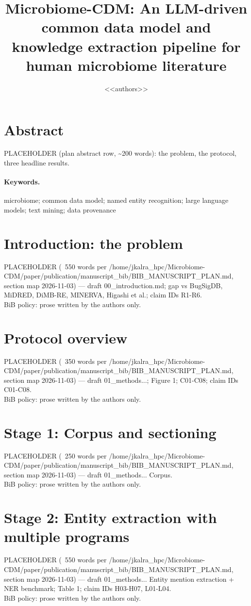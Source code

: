 \documentclass[11pt,a4paper]{article}
\title{Microbiome-CDM: An LLM-driven common data model and knowledge
extraction pipeline for human microbiome literature}
\author{<<authors>>}
\date{}
\begin{document}
\maketitle

\section*{Abstract}
PLACEHOLDER (plan abstract row, \textasciitilde200 words): the problem, the protocol, three headline results.

\paragraph{Keywords.} microbiome; common data model; named entity recognition; large language models; text mining; data provenance %

\section{Introduction: the problem}
PLACEHOLDER (~550 words per /home/jkalra\_hpc/Microbiome-CDM/paper/publication/manuscript\_bib/BIB\_MANUSCRIPT\_PLAN.md, section map 2026-11-03) --- draft 00\_introduction.md; gap vs BugSigDB, MiDRED, DiMB-RE, MINERVA, Higashi et al.; claim IDs R1-R6.\\
BiB policy: prose written by the authors only.

\section{Protocol overview}
PLACEHOLDER (~350 words per /home/jkalra\_hpc/Microbiome-CDM/paper/publication/manuscript\_bib/BIB\_MANUSCRIPT\_PLAN.md, section map 2026-11-03) --- draft 01\_methods...; Figure 1; C01-C08; claim IDs C01-C08.\\
BiB policy: prose written by the authors only.

\section{Stage 1: Corpus and sectioning}
PLACEHOLDER (~250 words per /home/jkalra\_hpc/Microbiome-CDM/paper/publication/manuscript\_bib/BIB\_MANUSCRIPT\_PLAN.md, section map 2026-11-03) --- draft 01\_methods... Corpus.\\
BiB policy: prose written by the authors only.

\section{Stage 2: Entity extraction with multiple programs}
PLACEHOLDER (~550 words per /home/jkalra\_hpc/Microbiome-CDM/paper/publication/manuscript\_bib/BIB\_MANUSCRIPT\_PLAN.md, section map 2026-11-03) --- draft 01\_methods... Entity mention extraction + NER benchmark; Table 1; claim IDs H03-H07, L01-L04.\\
BiB policy: prose written by the authors only.
\end{document}
